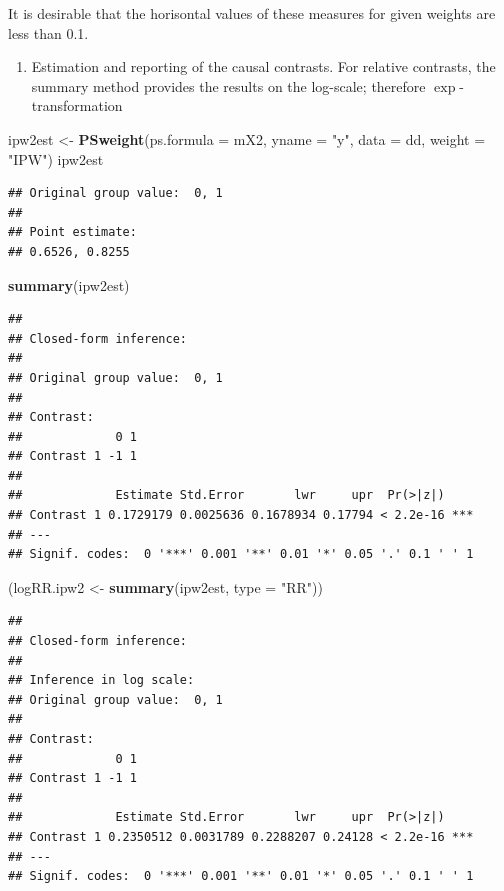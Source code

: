 \documentclass[
]{book}
\newenvironment{Shaded}{\begin{snugshade}}{\end{snugshade}}
\newcommand{\AttributeTok}[1]{\textcolor[rgb]{0.13,0.29,0.53}{#1}}
\newcommand{\FunctionTok}[1]{\textcolor[rgb]{0.13,0.29,0.53}{\textbf{#1}}}
\newcommand{\NormalTok}[1]{#1}
\newcommand{\OtherTok}[1]{\textcolor[rgb]{0.56,0.35,0.01}{#1}}
\newcommand{\StringTok}[1]{\textcolor[rgb]{0.31,0.60,0.02}{#1}}
\providecommand{\tightlist}{%
  \setlength{\itemsep}{0pt}\setlength{\parskip}{0pt}}
\begin{document}
It is desirable that the horisontal values of
these measures for given weights are less than 0.1.

\begin{enumerate}
\def\labelenumi{\arabic{enumi}.}
\setcounter{enumi}{2}
\tightlist
\item
  Estimation and reporting of the causal contrasts. For relative
  contrasts, the summary method provides the results
  on the log-scale; therefore \(\exp\)-transformation
\end{enumerate}

\begin{Shaded}
\begin{Highlighting}[]
\NormalTok{ipw2est }\OtherTok{\textless{}{-}} \FunctionTok{PSweight}\NormalTok{(}\AttributeTok{ps.formula =}\NormalTok{ mX2, }\AttributeTok{yname =} \StringTok{"y"}\NormalTok{, }\AttributeTok{data =}\NormalTok{ dd, }\AttributeTok{weight =} \StringTok{"IPW"}\NormalTok{)}
\NormalTok{ipw2est}
\end{Highlighting}
\end{Shaded}

\begin{verbatim}
## Original group value:  0, 1 
## 
## Point estimate: 
## 0.6526, 0.8255
\end{verbatim}

\begin{Shaded}
\begin{Highlighting}[]
\FunctionTok{summary}\NormalTok{(ipw2est)}
\end{Highlighting}
\end{Shaded}

\begin{verbatim}
## 
## Closed-form inference: 
## 
## Original group value:  0, 1 
## 
## Contrast: 
##             0 1
## Contrast 1 -1 1
## 
##             Estimate Std.Error       lwr     upr  Pr(>|z|)    
## Contrast 1 0.1729179 0.0025636 0.1678934 0.17794 < 2.2e-16 ***
## ---
## Signif. codes:  0 '***' 0.001 '**' 0.01 '*' 0.05 '.' 0.1 ' ' 1
\end{verbatim}

\begin{Shaded}
\begin{Highlighting}[]
\NormalTok{(logRR.ipw2 }\OtherTok{\textless{}{-}} \FunctionTok{summary}\NormalTok{(ipw2est, }\AttributeTok{type =} \StringTok{"RR"}\NormalTok{))}
\end{Highlighting}
\end{Shaded}

\begin{verbatim}
## 
## Closed-form inference: 
## 
## Inference in log scale: 
## Original group value:  0, 1 
## 
## Contrast: 
##             0 1
## Contrast 1 -1 1
## 
##             Estimate Std.Error       lwr     upr  Pr(>|z|)    
## Contrast 1 0.2350512 0.0031789 0.2288207 0.24128 < 2.2e-16 ***
## ---
## Signif. codes:  0 '***' 0.001 '**' 0.01 '*' 0.05 '.' 0.1 ' ' 1
\end{verbatim}
\end{document}
